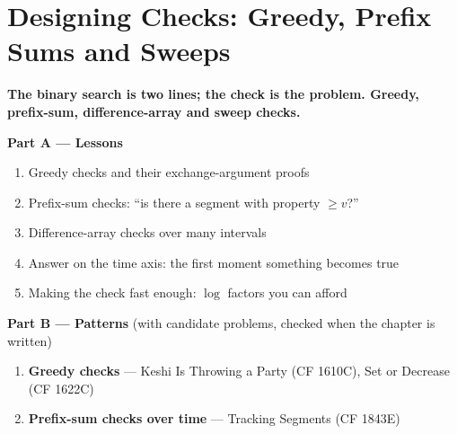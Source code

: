 \chapter{Designing Checks: Greedy, Prefix Sums and Sweeps}
\label{ch:checks}

\begin{tcolorbox}[enhanced, colback=white, colframe=secondaryblue, boxrule=1pt, arc=2mm]
\textbf{\large\textcolor{primaryblue}{The binary search is two lines; the check is the problem. Greedy, prefix-sum, difference-array and sweep checks.}}
\end{tcolorbox}


\begin{plannedbox}
\textbf{Part A --- Lessons}
\begin{enumerate}[leftmargin=*, label=\textbf{A\arabic*.}, itemsep=1pt]
    \item Greedy checks and their exchange-argument proofs
    \item Prefix-sum checks: ``is there a segment with property $\ge v$?''
    \item Difference-array checks over many intervals
    \item Answer on the time axis: the first moment something becomes true
    \item Making the check fast enough: $\log$ factors you can afford
\end{enumerate}
\textbf{Part B --- Patterns} (with candidate problems, checked when the chapter is written)
\begin{enumerate}[leftmargin=*, label=\textbf{P\arabic*.}, itemsep=1pt]
    \item \textbf{Greedy checks} --- Keshi Is Throwing a Party {\small\color{darkgray}(CF 1610C)}, Set or Decrease {\small\color{darkgray}(CF 1622C)}
    \item \textbf{Prefix-sum checks over time} --- Tracking Segments {\small\color{darkgray}(CF 1843E)}
\end{enumerate}
\end{plannedbox}
